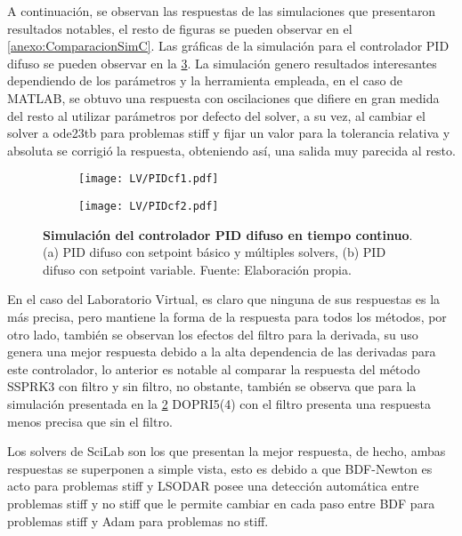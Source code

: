         A continuación, se observan las respuestas de las simulaciones que presentaron resultados notables, el resto de figuras se pueden observar en el \ref{anexo:ComparacionSimC}. Las gráficas de la simulación para el controlador PID difuso se pueden observar en la \cref{fig:PIDcf}. La simulación genero resultados interesantes dependiendo de los parámetros y la herramienta empleada, en el caso de MATLAB, se obtuvo una respuesta con oscilaciones que difiere en gran medida del resto al utilizar parámetros por defecto del solver, a su vez, al cambiar el solver a ode23tb para problemas stiff y fijar un valor para la tolerancia relativa y absoluta se corrigió la respuesta, obteniendo así, una salida muy parecida al resto.

        \begin{figure}[htb]
            \centering
            \begin{subfigure}[t]{0.49\textwidth}
                \centering
                \texttt{[image: LV/PIDcf1.pdf]}
                \caption{}
                \label{fig:PIDcf1}
            \end{subfigure}
            \hfill
            \begin{subfigure}[t]{0.49\textwidth}
                \centering
                \texttt{[image: LV/PIDcf2.pdf]}
                \caption{}
                \label{fig:PIDcf2}
            \end{subfigure}
            \caption[Simulación del controlador PID difuso en tiempo continuo]{\textbf{Simulación del controlador PID difuso en tiempo continuo}. (a) PID difuso con setpoint básico y múltiples solvers, (b) PID difuso con setpoint variable. Fuente: Elaboración propia. \label{fig:PIDcf}}
        \end{figure}

        En el caso del Laboratorio Virtual, es claro que ninguna de sus respuestas es la más precisa, pero mantiene la forma de la respuesta para todos los métodos, por otro lado, también se observan los efectos del filtro para la derivada, su uso genera una mejor respuesta debido a la alta dependencia de las derivadas para este controlador, lo anterior es notable al comparar la respuesta del método SSPRK3 con filtro y sin filtro, no obstante, también se observa que para la simulación presentada en la \cref{fig:PIDcf2} DOPRI5(4) con el filtro presenta una respuesta menos precisa que sin el filtro. 
        
        Los solvers de SciLab son los que presentan la mejor respuesta, de hecho, ambas respuestas se superponen a simple vista, esto es debido a que BDF-Newton es acto para problemas stiff y LSODAR posee una detección automática entre problemas stiff y no stiff que le permite cambiar en cada paso entre BDF para problemas stiff y Adam para problemas no stiff.
        
